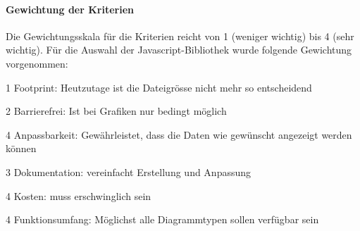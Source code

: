\paragraph*{Gewichtung der Kriterien}
Die Gewichtungsskala für die Kriterien reicht von 1 (weniger wichtig) bis 4 (sehr wichtig). Für die Auswahl der Javascript-Bibliothek wurde folgende Gewichtung vorgenommen:
\begin{itemize*}
\item 1 Footprint: Heutzutage ist die Dateigrösse nicht mehr so entscheidend
\item 2 Barrierefrei: Ist bei Grafiken nur bedingt möglich
\item 4 Anpassbarkeit: Gewährleistet, dass die Daten wie gewünscht angezeigt werden können
\item 3 Dokumentation: vereinfacht Erstellung und Anpassung
\item 4 Kosten: muss erschwinglich sein
\item 4 Funktionsumfang: Möglichst alle Diagrammtypen sollen verfügbar sein
\end{itemize*}



